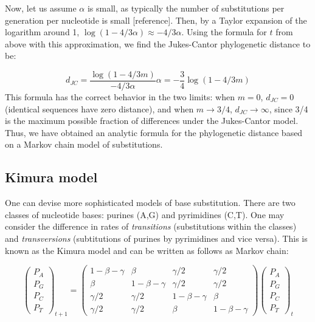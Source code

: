 \documentclass[
  letterpaper,
  DIV=11,
  numbers=noendperiod]{scrreprt}
\begin{document}
Now, let us assume \(\alpha\) is small, as typically the number of
substitutions per generation per nucleotide is small {[}reference{]}.
Then, by a Taylor expansion of the logarithm around 1,
\(\log (1 -4/3 \alpha) \approx - 4/3\alpha\). Using the formula for
\(t\) from above with this approximation, we find the Jukes-Cantor
phylogenetic distance to be:

\[ 
d_{JC} = \frac{\log (1 - 4/3 m)}{ -4/3 \alpha} \alpha =  -\frac{3}{4}\log (1 - 4/3 m)
\] This formula has the correct behavior in the two limits: when
\(m = 0\), \(d_{JC} = 0\) (identical sequences have zero distance), and
when \(m \rightarrow 3/4\), \(d_{JC} \rightarrow \infty\), since 3/4 is
the maximum possible fraction of differences under the Jukes-Cantor
model. Thus, we have obtained an analytic formula for the phylogenetic
distance based on a Markov chain model of substitutions.

\subsection{Kimura model}\label{kimura-model}

One can devise more sophisticated models of base substitution. There are
two classes of nucleotide bases: purines (A,G) and pyrimidines (C,T).
One may consider the difference in rates of \emph{transitions}
(substitutions within the classes) and \emph{transversions}
(subtitutions of purines by pyrimidines and vice versa). This is known
as the Kimura model and can be written as follows as Markov chain:

\[   
\left(\begin{array}{c} P_A \\ P_G \\ P_C \\ P_T \end{array}\right)_{t+1}  = \left(\begin{array}{cccc}1-\beta-\gamma & \beta & \gamma/2 &  \gamma/2 \\ \beta  & 1-\beta-\gamma & \gamma/2 & \gamma/2 \\ \gamma/2 & \gamma/2 & 1-\beta-\gamma& \beta  \\ \gamma/2 &\gamma/2 & \beta  & 1-\beta-\gamma \end{array}\right) \left(\begin{array}{c} P_A \\ P_G \\ P_C \\ P_T \end{array}\right)_t 
\]
\end{document}
